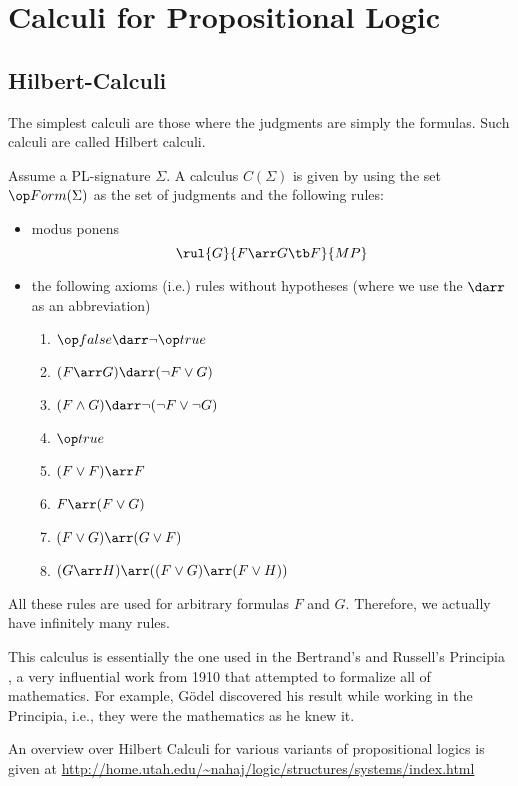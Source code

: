 \section{Calculi for Propositional Logic}

\subsection{Hilbert-Calculi}

The simplest calculi are those where the judgments are simply the formulas. Such calculi are called Hilbert calculi.

Assume a PL-signature $\Sigma$. A calculus $C(\Sigma)$ is given by using the set $\Forms(\Sigma)$ as the set of judgments and the following rules:
\begin{itemize}
 \item modus ponens
    \[\rul{G}{F\arr G \tb F}{MP}\]
 \item the following axioms (i.e.) rules without hypotheses (where we use the $\darr$ as an abbreviation)
   \begin{enumerate}
     \item $\false \darr \neg\true$
     \item $(F\arr G)\darr (\neg F\vee G)$
     \item $(F\wedge G)\darr \neg (\neg F\vee \neg G)$
     \item $\true$
     \item $(F\vee F)\arr F$
     \item $F\arr (F\vee G)$
     \item $(F\vee G)\arr (G\vee F)$
     \item $(G\arr H) \arr ((F\vee G)\arr (F\vee H))$
   \end{enumerate}  
\end{itemize}
All these rules are used for arbitrary formulas $F$ and $G$. Therefore, we actually have infinitely many rules.

This calculus is essentially the one used in the Bertrand's and Russell's Principia \cite{principia}, a very influential work from 1910 that attempted to formalize all of mathematics. For example, G\"odel discovered his result \cite{goedelincompleteness} while working in the Principia, i.e., they were the mathematics as he knew it.

An overview over Hilbert Calculi for various variants of propositional logics is given at \url{http://home.utah.edu/~nahaj/logic/structures/systems/index.html}


